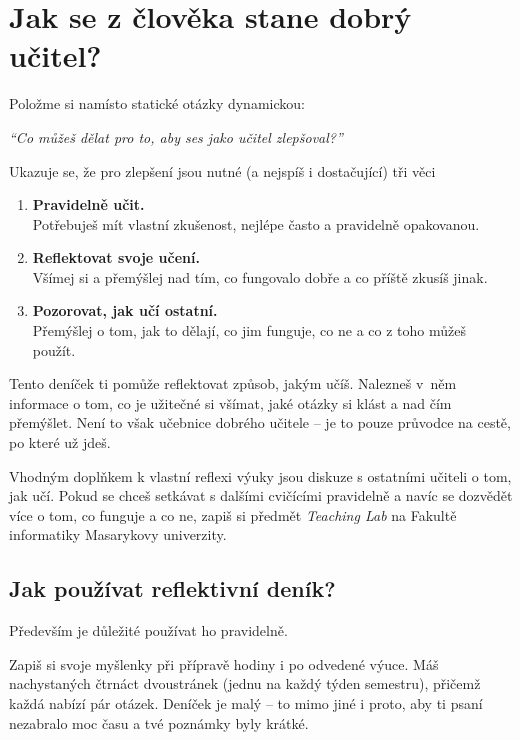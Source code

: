 
\chapter*{Jak se z člověka stane dobrý učitel?}

\vspace*{1em}
Položme si namísto statické otázky dynamickou:

\vspace*{1em}
\textit{\large \enquote{Co můžeš dělat pro to, aby ses jako učitel zlepšoval?}}

\vspace*{1em}
Ukazuje se, že pro zlepšení jsou nutné (a nejspíš i dostačující) tři věci\footnotemark
{}
\begin{enumerate}
\item \textbf{Pravidelně učit.}\\Potřebuješ mít vlastní zkušenost, nejlépe často a pravidelně opakovanou.
\item \textbf{Reflektovat svoje učení.}\\Všímej si a přemýšlej nad tím, co fungovalo dobře a co příště zkusíš jinak.
\item \textbf{Pozorovat, jak učí ostatní.}\\Přemýšlej o tom, jak to dělají, co jim funguje, co ne a co z toho můžeš použít.
\end{enumerate}

Tento deníček ti pomůže reflektovat způsob, jakým učíš. Nalezneš v~něm informace o tom, co je užitečné si všímat, jaké otázky si klást a nad čím přemýšlet. Není to však učebnice dobrého učitele -- je to pouze průvodce na cestě, po které už jdeš.

Vhodným doplňkem k vlastní reflexi výuky jsou diskuze s ostatními učiteli o tom, jak učí. Pokud se chceš setkávat s dalšími cvičícími pravidelně a navíc se dozvědět více o tom, co funguje a co ne, zapiš si předmět \textit{Teaching Lab} na Fakultě informatiky Masarykovy univerzity.

\newpage
\section*{Jak používat reflektivní deník?}

Především je důležité používat ho pravidelně.

Zapiš si svoje myšlenky při přípravě hodiny i po odvedené výuce. Máš nachystaných čtrnáct dvoustránek (jednu na každý týden semestru), přičemž každá nabízí pár otázek. Deníček je malý -- to mimo jiné i proto, aby ti psaní nezabralo moc času a tvé poznámky byly krátké.

